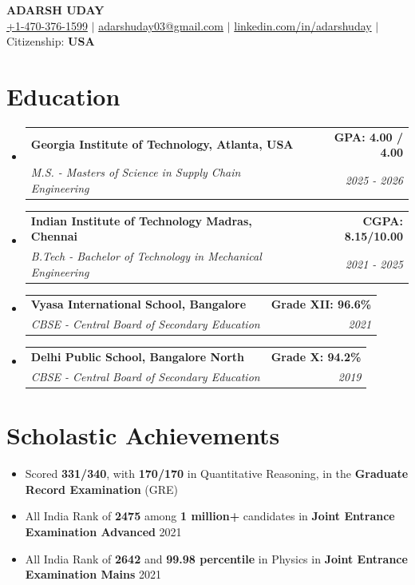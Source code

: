\documentclass[letterpaper,10pt]{article}
\makeatletter
\newcommand{\resumeSubheading}[4]{
  \vspace{-1pt}\item
    \begin{tabular*}{1.0\textwidth}[t]{l@{\extracolsep{\fill}}r}
      \textbf{#1} & \textbf{\small #2} \\
      \textit{\small#3} & \textit{\small #4} \\
    \end{tabular*}\vspace{-4pt}
}
\newcommand{\resumeSubHeadingListStart}{\begin{itemize}[leftmargin=0.0in, label={}]}
\newcommand{\resumeSubHeadingListEnd}{\end{itemize}}
\makeatother
\begin{document}
\begin{center}
    {\LARGE  \textbf{ADARSH UDAY}} \\[4pt]
    \href{tel:+1-470-376-1599}{+1-470-376-1599} $\vert$ 
    \href{mailto:adarshuday03@gmail.com}{adarshuday03@gmail.com} $\vert$ 
   \href{https://www.linkedin.com/in/adarshuday}{linkedin.com/in/adarshuday} $\vert$  %
    \large{Citizenship: \textbf{USA}} \\[-1000pt]
\end{center}
\vspace{-12pt}
\section{\Large{Education}}
    \resumeSubHeadingListStart
        \resumeSubheading
        {Georgia Institute of Technology, Atlanta, USA}{GPA: 4.00 / 4.00}
        {M.S. - Masters of Science in Supply Chain Engineering}{2025 - 2026}
        \vspace{-4pt}
        \resumeSubheading
        {Indian Institute of Technology Madras, Chennai}{CGPA: 8.15/10.00}
        {B.Tech - Bachelor of Technology in Mechanical Engineering}{2021 - 2025}
        \vspace{-4pt}
        \resumeSubheading
        {Vyasa International School, Bangalore}{Grade XII: 96.6\%}
        {CBSE - Central Board of Secondary Education}{2021}
        \vspace{-4pt}
        \resumeSubheading
        {Delhi Public School, Bangalore North}{Grade X: 94.2\%}
        {CBSE - Central Board of Secondary Education}{2019}
        \vspace{-4pt}
    \resumeSubHeadingListEnd
    \vspace{-10pt}

\section{\Large{Scholastic Achievements}}
\begin{itemize}
    \itemsep0em
    \item Scored \textbf{331/340}, with \textbf{170/170} in Quantitative Reasoning, in the \textbf{Graduate Record Examination} (GRE)
    \vspace{-2pt}

    \item All India Rank of \textbf{2475} among \textbf{1 million+} candidates in \textbf{Joint Entrance Examination Advanced} 2021
    \vspace{-2pt}
    \item All India Rank of \textbf{2642} and \textbf{99.98 percentile} in Physics in \textbf{Joint Entrance Examination Mains} 2021
    \vspace{-2pt}

\end{itemize}
\vspace{-12pt}
\end{document}
